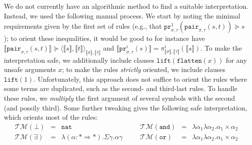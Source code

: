 \documentclass[a4paper,UKenglish,cleveref,autoref,numberwithinsect]{lipics-v2019}
\theoremstyle{definition}
\newcommand{\arrkind}{\Rightarrow}
\newcommand{\pair}[2]{\langle #1,#2 \rangle}
\newcommand{\nat}{\mathtt{nat}}
\newcommand{\flatten}{\mathtt{flatten}}
\newcommand{\lift}{\mathtt{lift}}
\newcommand{\typeinterpret}[1]{\llbracket #1 \rrbracket}
\newcommand{\interpret}[1]{\llbracket #1 \rrbracket}
\newcommand{\Typemap}{\mathcal{T\!M}}
\newcommand{\Termmap}{\mathcal{J}}
\newcommand{\succinterpret}{\succ^{\Termmap}}
\newcommand{\proj}{\mathtt{pr}}
\begin{document}
We do not currently have an algorithmic method to find a
suitable interpretation.  Instead, we used the following manual process.
We start by noting the minimal requirements given by the first set of
rules (e.g., that $\proj^1_{\sigma,\tau}(\mathtt{pair}_{\sigma,\tau}(s,
t)) \succeq s$); to orient these inequalities, it would be good to for
instance have $\interpret{\mathtt{pair}_{\sigma,\tau}(s,t)} \succeq
\pair{\interpret{s}}{\interpret{t}}_{\typeinterpret{\sigma},
\typeinterpret{\tau}}$ and $\interpret{\proj^i_{\sigma,\tau}(s)} =
\pi^i_{\typeinterpret{\sigma},\typeinterpret{\tau}}(\interpret{s})$.
To make the interpretation safe, we additionally include clauses
$\lift(\flatten(x))$ for any unsafe arguments $x$; to make the rules
\emph{strictly} oriented, we include clauses $\lift(1)$.  %
Unfortunately, this approach does not suffice to orient the rules
where some terms are duplicated, such as the second- and third-last
rules.  To handle these rules, we \emph{multiply} the first argument
of several symbols with the second (and possily third).  Some further
tweaking gives the following safe interpretation, which orients most
of the rules:
\[
\begin{array}{rclcrcl}
\Typemap(\bot) & = & \nat
& \quad &
\Typemap(\mathtt{and}) & = & \lambda\alpha_1\lambda\alpha_2 . \alpha_1\times\alpha_2 \\

\Typemap(\exists) & = & \lambda(\alpha : * \arrkind *) . \Sigma \gamma . \alpha \gamma
& \quad &
\Typemap(\mathtt{or}) & = & \lambda\alpha_1\lambda\alpha_2 . \alpha_1\times\alpha_2 \\
\end{array}
\]
\end{document}
